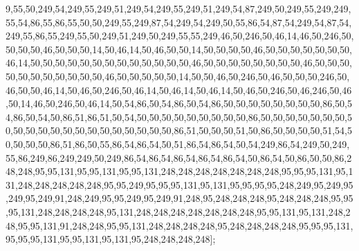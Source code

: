 9,55,50,249,54,249,55,249,51,249,54,249,55,249,51,249,54,87,249,50,249,55,249,249,55,54,86,55,86,55,50,50,249,55,249,87,54,249,54,249,50,55,86,54,87,54,249,54,87,54,249,55,86,55,249,55,50,249,51,249,50,249,55,55,249,46,50,246,50,46,14,46,50,246,50,50,50,50,46,50,50,50,14,50,46,14,50,46,50,50,14,50,50,50,50,46,50,50,50,50,50,50,50,46,14,50,50,50,50,50,50,50,50,50,50,50,50,50,46,50,50,50,50,50,50,50,50,46,50,50,50,50,50,50,50,50,50,50,50,46,50,50,50,50,50,14,50,50,46,50,246,50,46,50,50,50,246,50,46,50,50,46,14,50,46,50,246,50,46,14,50,46,14,50,46,14,50,46,50,246,50,46,246,50,46,50,14,46,50,246,50,46,14,50,54,86,50,54,86,50,54,86,50,50,50,50,50,50,50,50,86,50,54,86,50,54,50,86,51,86,51,50,54,50,50,50,50,50,50,50,50,50,86,50,50,50,50,50,50,50,50,50,50,50,50,50,50,50,50,50,50,50,50,50,86,51,50,50,50,51,50,86,50,50,50,50,51,54,50,50,50,50,86,51,86,50,55,86,54,86,54,50,51,86,54,86,54,50,54,249,86,54,249,50,249,55,86,249,86,249,249,50,249,86,54,86,54,86,54,86,54,86,54,50,86,54,50,86,50,50,86,248,248,95,95,131,95,95,131,95,95,131,248,248,248,248,248,248,248,95,95,95,131,95,131,248,248,248,248,248,95,95,249,95,95,95,131,95,131,95,95,95,95,248,249,95,249,95,249,95,249,91,248,249,95,95,249,95,249,91,248,95,248,248,248,95,248,248,248,95,95,95,131,248,248,248,248,95,131,248,248,248,248,248,248,248,95,95,131,95,131,248,248,95,95,131,91,248,248,95,95,131,248,248,248,248,95,248,248,248,248,95,95,95,131,95,95,95,131,95,95,131,95,131,95,248,248,248,248];


